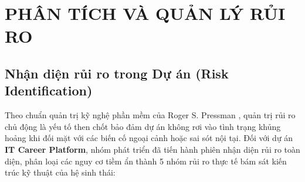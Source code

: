 \chapter{PHÂN TÍCH VÀ QUẢN LÝ RỦI RO}
\label{chap:quan-ly-rui-ro}

\section{Nhận diện rủi ro trong Dự án (Risk Identification)}
\label{sec:nhan-dien-rui-ro}

Theo chuẩn quản trị kỹ nghệ phần mềm của Roger S. Pressman \cite{pressman2020}, quản trị rủi ro chủ động là yếu tố then chốt bảo đảm dự án không rơi vào tình trạng khủng hoảng khi đối mặt với các biến cố ngoại cảnh hoặc sai sót nội tại. Đối với dự án \textbf{IT Career Platform}, nhóm phát triển đã tiến hành phiên nhận diện rủi ro toàn diện, phân loại các nguy cơ tiềm ẩn thành 5 nhóm rủi ro thực tế bám sát kiến trúc kỹ thuật của hệ sinh thái:


